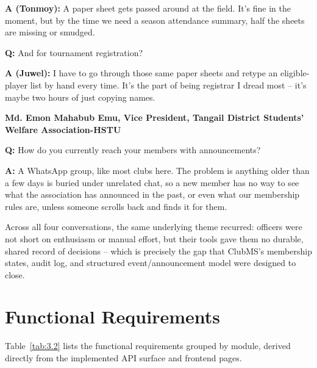 \documentclass[12pt,oneside]{book}
\begin{document}
\noindent\textbf{A (Tonmoy):} A paper sheet gets passed around at the field. It's fine in the moment, but by the time we need a season attendance summary, half the sheets are missing or smudged.

\smallskip
\noindent\textbf{Q:} And for tournament registration?

\noindent\textbf{A (Juwel):} I have to go through those same paper sheets and retype an eligible-player list by hand every time. It's the part of being registrar I dread most -- it's maybe two hours of just copying names.

\bigskip
\noindent\textbf{Md. Emon Mahabub Emu, Vice President, Tangail District Students' Welfare Association-HSTU}

\smallskip
\noindent\textbf{Q:} How do you currently reach your members with announcements?

\noindent\textbf{A:} A WhatsApp group, like most clubs here. The problem is anything older than a few days is buried under unrelated chat, so a new member has no way to see what the association has announced in the past, or even what our membership rules are, unless someone scrolls back and finds it for them.

\bigskip
Across all four conversations, the same underlying theme recurred: officers were not short on enthusiasm or manual effort, but their tools gave them no durable, shared record of decisions -- which is precisely the gap that ClubMS's membership states, audit log, and structured event/announcement model were designed to close.

\section{Functional Requirements}

Table~\ref{tab:3.2} lists the functional requirements grouped by module, derived directly from the implemented API surface and frontend pages.
\end{document}
